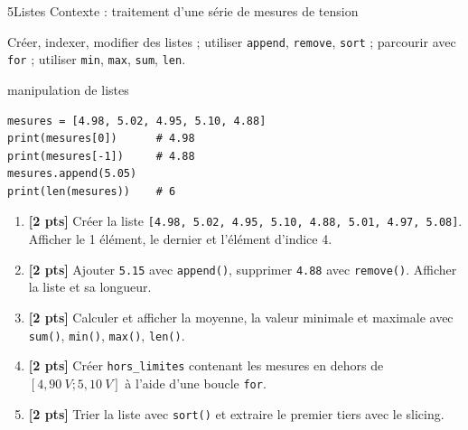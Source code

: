 \documentclass[10pt,a4paper]{article}
\begin{document}
\clearpage
\begin{tptitre}{5}{Listes}
  Contexte : traitement d'une série de mesures de tension
\end{tptitre}

\begin{objectifbox}
  Créer, indexer, modifier des listes ; utiliser \texttt{append}, \texttt{remove}, \texttt{sort} ; parcourir avec \texttt{for} ; utiliser \texttt{min}, \texttt{max}, \texttt{sum}, \texttt{len}.
\end{objectifbox}

\begin{codebox}{manipulation de listes}
\begin{lstlisting}
mesures = [4.98, 5.02, 4.95, 5.10, 4.88]
print(mesures[0])      # 4.98
print(mesures[-1])     # 4.88
mesures.append(5.05)
print(len(mesures))    # 6
\end{lstlisting}
\end{codebox}

\begin{enumerate}[leftmargin=*, label=\textbf{Q\arabic*.}]
  \item \textbf{[2 pts]} Créer la liste \texttt{[4.98, 5.02, 4.95, 5.10, 4.88, 5.01, 4.97, 5.08]}. Afficher le 1\ier{} élément, le dernier et l'élément d'indice 4.
  \item \textbf{[2 pts]} Ajouter \texttt{5.15} avec \texttt{append()}, supprimer \texttt{4.88} avec \texttt{remove()}. Afficher la liste et sa longueur.
  \item \textbf{[2 pts]} Calculer et afficher la moyenne, la valeur minimale et maximale avec \texttt{sum()}, \texttt{min()}, \texttt{max()}, \texttt{len()}.
  \item \textbf{[2 pts]} Créer \texttt{hors\_limites} contenant les mesures en dehors de $[4{,}90\ V ; 5{,}10\ V]$ à l'aide d'une boucle \texttt{for}.
  \item \textbf{[2 pts]} Trier la liste avec \texttt{sort()} et extraire le premier tiers avec le slicing.
\end{enumerate}
\end{document}
